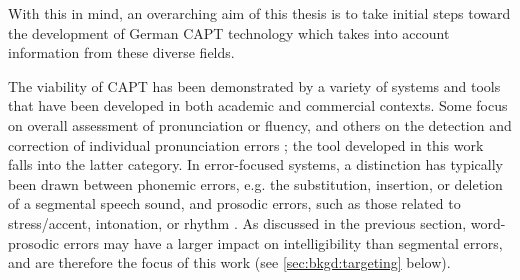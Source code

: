 With this in mind, an overarching aim of this thesis is to take initial steps toward the development of German CAPT technology which takes into account information from these diverse fields. 
%
%	
%
%
%	
%	
	\label{sec:capt:systems}
		
	The viability of CAPT has been demonstrated by a variety of systems and tools that have been developed in both academic and commercial contexts. Some focus on overall assessment of pronunciation or fluency, and others on the detection and correction of individual pronunciation errors \citep{Eskenazi2009}; the tool developed in this work falls into the latter category. In error-focused systems, a distinction has typically been drawn between phonemic errors, e.g. the substitution, insertion, or deletion of a segmental speech sound, and prosodic errors, such as those related to stress/accent, intonation, or rhythm \citep{Witt2012}. As discussed in the previous section, word-prosodic errors may have a larger impact on intelligibility than segmental errors, and are therefore the focus of this work (see \cref{sec:bkgd:targeting} below). 
	
	
	
